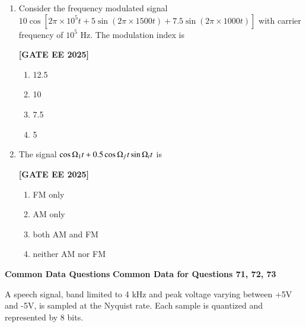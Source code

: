 \documentclass[12pt]{article}
\begin{document}
\begin{enumerate}[leftmargin=*, label=\textbf{Q.\arabic*:}]
\item Consider the frequency modulated signal $10\cos[2\pi \times 10^5 t + 5\sin(2\pi \times 1500 t) + 7.5\sin(2\pi \times 1000 t)]$ with carrier frequency of $10^5$ Hz. The modulation index is
 
\noindent \textbf{[GATE EE 2025]}
\begin{enumerate}
  \item 12.5
  \item 10
  \item 7.5
  \item 5
\end{enumerate}

\item The signal $\cos \ohm_1 t + 0.5 \cos \ohm_f t \sin \ohm_t t$ is
 
\noindent \textbf{[GATE EE 2025]}
\begin{enumerate}
  \item FM only
  \item AM only
  \item both AM and FM
  \item neither AM nor FM
\end{enumerate}

\end{enumerate}


 \large \textbf {Common Data Questions}
 \large \textbf {Common Data for Questions 71, 72, 73}

 
A speech signal, band limited to 4 kHz and peak voltage varying between +5V and -5V, is sampled at the Nyquist rate. Each sample is quantized and represented by 8 bits.
\end{document}
